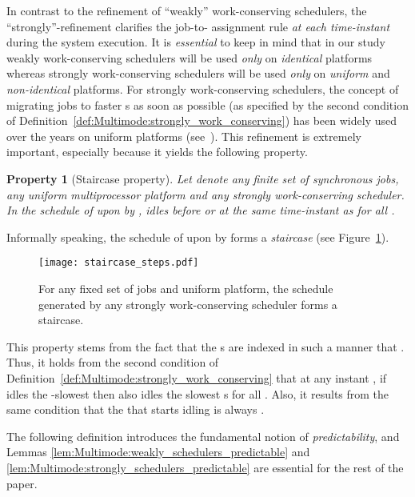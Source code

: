 \documentclass{article}
\newtheorem{validity test}{Validity Test}
\newtheorem{Property}{Property}
\begin{document}
In contrast to the refinement of ``weakly'' work-conserving schedulers, the ``strongly''-refinement clarifies the job-to- assignment rule \emph{at each time-instant} during the system execution. It is \emph{essential} to keep in mind that in our study weakly work-conserving schedulers will be used \emph{only} on \emph{identical} platforms whereas strongly work-conserving schedulers will be used \emph{only} on \emph{uniform} and \emph{non-identical} platforms. For strongly work-conserving schedulers, the concept of migrating jobs to faster s as soon as possible (as specified by the second condition of Definition~\ref{def:Multimode:strongly_work_conserving}) has been widely used over the years on uniform platforms (see~\cite{BaruahGoossens:08:2,BaruahGoossens:03,GoossensFunkBaruah:02,BaruahGoossens:08,CucuGoossens:10,FunkGoossensBaruah:01}). This refinement is extremely important, especially because it yields the following property. 

\begin{Property}[Staircase property]
Let  denote any finite set of synchronous jobs,  any \emph{uniform} multiprocessor platform and  any \emph{strongly} work-conserving scheduler. In the schedule of  upon  by ,  idles before or at the same time-instant as  for all . 
\end{Property}

Informally speaking, the schedule of  upon  by  forms a \emph{staircase} (see Figure~\ref{fig:Multimode:unif_staircase}).

\begin{figure}
\begin{center}
\texttt{[image: staircase\_steps.pdf]}
\caption{For any fixed set of jobs and uniform platform, the schedule generated by any strongly work-conserving scheduler forms a staircase.}
\label{fig:Multimode:unif_staircase}
\end{center}
\end{figure}

This property stems from the fact that the s are indexed in such a manner that  . Thus, it holds from the second condition of Definition~\ref{def:Multimode:strongly_work_conserving} that at any instant , if  idles the -slowest  then  also idles the  slowest s for all . Also, it results from the same condition that the   that starts idling is always . 

The following definition introduces the fundamental notion of \emph{predictability}, and Lemmas \ref{lem:Multimode:weakly_schedulers_predictable} and \ref{lem:Multimode:strongly_schedulers_predictable} are essential for the rest of the paper. 
\end{document}
